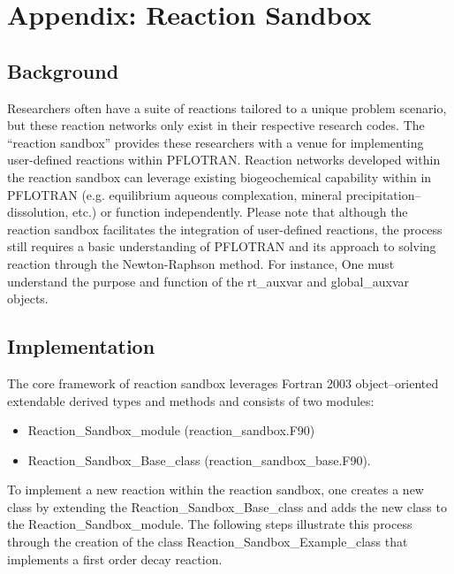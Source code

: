 \section{Appendix: Reaction Sandbox}

\setcounter{equation}{0}

\subsection{Background}

Researchers often have a suite of reactions tailored to a unique problem scenario, but these reaction networks only exist in their respective research codes. The ``reaction sandbox'' provides these researchers with a venue for implementing user-defined reactions within PFLOTRAN. Reaction networks developed within the reaction sandbox can leverage existing biogeochemical capability within in PFLOTRAN (e.g. equilibrium aqueous complexation, mineral precipitation--dissolution, etc.) or function independently. Please note that although the reaction sandbox facilitates the integration of user-defined reactions, the process still requires a basic understanding of PFLOTRAN and its approach to solving reaction through the Newton-Raphson method. For instance,  One must understand the purpose and function of the rt\_auxvar and global\_auxvar objects.

\subsection{Implementation}
The core framework of reaction sandbox leverages Fortran 2003 object--oriented extendable derived types and methods and consists of two modules:

\begin{itemize}
  \item[] Reaction\_Sandbox\_module (reaction\_sandbox.F90)
  \item[] Reaction\_Sandbox\_Base\_class (reaction\_sandbox\_base.F90).
\end{itemize}

To implement a new reaction within the reaction sandbox, one creates a new class by extending the Reaction\_Sandbox\_Base\_class and adds the new class to the Reaction\_Sandbox\_module.  The following steps illustrate this process through the creation of the class Reaction\_Sandbox\_Example\_class that implements a first order decay reaction.

